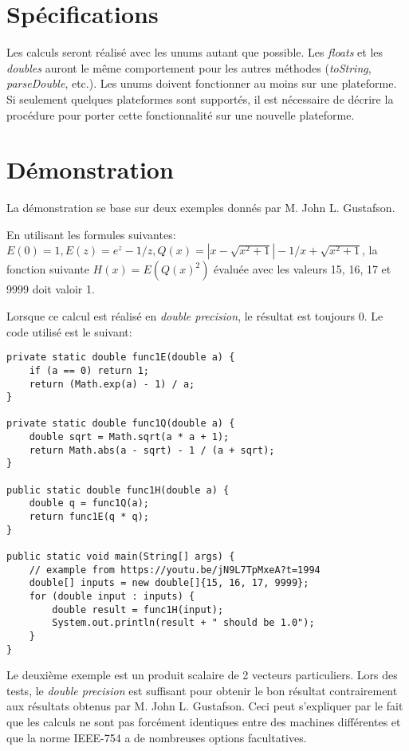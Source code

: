 \section{Spécifications}

Les calculs seront réalisé avec les unums autant que possible. Les \textit{floats} et les \textit{doubles} auront le même comportement pour les autres méthodes (\textit{toString}, \textit{parseDouble}, etc.). Les unums doivent fonctionner au moins sur une plateforme. Si seulement quelques plateformes sont supportés, il est nécessaire de décrire la procédure pour porter cette fonctionnalité sur une nouvelle plateforme.

\section{Démonstration}

La démonstration se base sur deux exemples donnés par M. John L. Gustafson.

En utilisant les formules suivantes: $E(0) = 1, E(z) = {e^z - 1}/z, Q(x) = |x - \sqrt{x^2 + 1}| - 1/{x+\sqrt{x^2 + 1}}$, la fonction suivante $H(x) = E(Q(x)^2)$ évaluée avec les valeurs 15, 16, 17 et 9999 doit valoir 1.

Lorsque ce calcul est réalisé en \textit{double precision}, le résultat est toujours 0. Le code utilisé est le suivant:

\begin{verbatim}
private static double func1E(double a) {
    if (a == 0) return 1;
    return (Math.exp(a) - 1) / a;
}

private static double func1Q(double a) {
    double sqrt = Math.sqrt(a * a + 1);
    return Math.abs(a - sqrt) - 1 / (a + sqrt);
}

public static double func1H(double a) {
    double q = func1Q(a);
    return func1E(q * q);
}

public static void main(String[] args) {
    // example from https://youtu.be/jN9L7TpMxeA?t=1994
    double[] inputs = new double[]{15, 16, 17, 9999};
    for (double input : inputs) {
        double result = func1H(input);
        System.out.println(result + " should be 1.0");
    }
}
\end{verbatim}

Le deuxième exemple est un produit scalaire de 2 vecteurs particuliers. Lors des tests, le \textit{double precision} est suffisant pour obtenir le bon résultat contrairement aux résultats obtenus par M. John L. Gustafson. Ceci peut s'expliquer par le fait que les calculs ne sont pas forcément identiques entre des machines différentes et que la norme IEEE-754 \cite{ieee-754-2019} a de nombreuses options facultatives.

